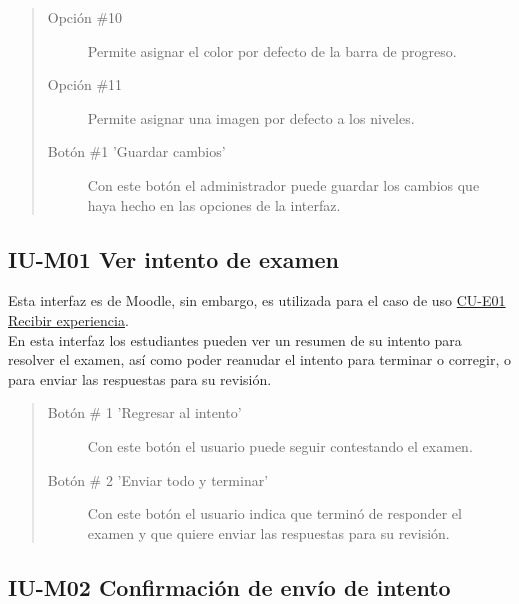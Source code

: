     \begin{quote}
    \begin{description}
    	\item[Opción \#10] Permite asignar el color por defecto de la barra de progreso.
    	\item[Opción \#11] Permite asignar una imagen por defecto a los niveles.
    	\item[Botón \#1 'Guardar cambios'] Con este botón el administrador puede guardar los cambios que haya hecho en las opciones de la interfaz.
    \end{description}
    \end{quote}

\clearpage

\subsection*{IU-M01 Ver intento de examen}
\label{IUM01}

    Esta interfaz es de Moodle, sin embargo, es utilizada para el caso de uso \hyperref[CU-E01]{CU-E01 Recibir experiencia}.\\

    \noindent En esta interfaz los estudiantes pueden ver un resumen de su intento para resolver el examen, así como poder reanudar el intento para terminar o corregir, o para enviar las respuestas para su revisión.


    \begin{quote}
    \begin{description}
    	\item[Botón \# 1 'Regresar al intento'] Con este botón el usuario puede seguir contestando el examen.
    	\item[Botón \# 2 'Enviar todo y terminar'] Con este botón el usuario indica que terminó de responder el examen y que quiere enviar las respuestas para su revisión.
    \end{description}
    \end{quote}
	\clearpage

\subsection*{IU-M02 Confirmación de envío de intento}
\label{IUM02}

